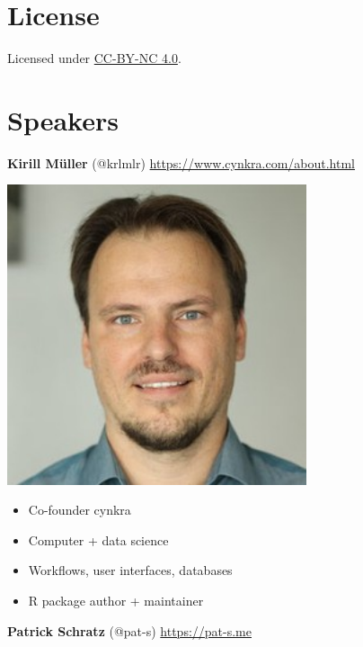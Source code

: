 \documentclass[]{book}
\providecommand{\tightlist}{%
  \setlength{\itemsep}{0pt}\setlength{\parskip}{0pt}}
\begin{document}
\hypertarget{license}{%
\section*{License}\label{license}}

Licensed under \href{https://creativecommons.org/licenses/by-nc/4.0/}{CC-BY-NC 4.0}.

\hypertarget{speakers}{%
\section*{Speakers}\label{speakers}}

\textbf{Kirill Müller} (@krlmlr) \url{https://www.cynkra.com/about.html}

\begin{flushright}\includegraphics[width=3.47in]{img/kirill} \end{flushright}

\begin{itemize}
\tightlist
\item
  Co-founder cynkra
\item
  Computer + data science
\item
  Workflows, user interfaces, databases
\item
  R package author + maintainer
\end{itemize}

\textbf{Patrick Schratz} (@pat-s) \url{https://pat-s.me}
\end{document}

